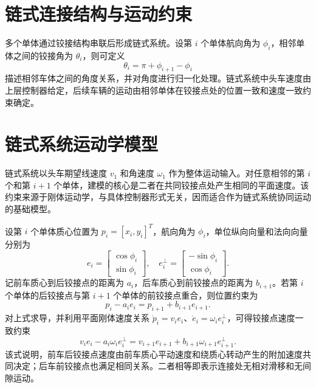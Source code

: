 \documentclass[type=bachelor]{bithesis}
\begin{document}
\section{链式连接结构与运动约束}
多个单体通过铰接结构串联后形成链式系统。设第 $i$ 个单体航向角为 $\phi_i$，相邻单体之间的铰接角为 $\theta_i$，则可定义
\begin{equation}
  \theta_i=\pi+\phi_{i+1}-\phi_i
\end{equation}
描述相邻车体之间的角度关系，并对角度进行归一化处理。链式系统中头车速度由上层控制器给定，后续车辆的运动由相邻单体在铰接点处的位置一致和速度一致约束确定。

\section{链式系统运动学模型}
链式系统以头车期望线速度 $v_1$ 和角速度 $\omega_1$ 作为整体运动输入。对任意相邻的第 $i$ 个和第 $i+1$ 个单体，建模的核心是二者在共同铰接点处产生相同的平面速度。该约束来源于刚体运动学，与具体控制器形式无关，因而适合作为链式系统协同运动的基础模型。

设第 $i$ 个单体质心位置为 $p_i=[x_i,y_i]^T$，航向角为 $\phi_i$，单位纵向向量和法向向量分别为
\begin{equation}
  e_i=
  \begin{bmatrix}
    \cos\phi_i\\
    \sin\phi_i
  \end{bmatrix},
  \quad
  e_i^\perp=
  \begin{bmatrix}
    -\sin\phi_i\\
    \cos\phi_i
  \end{bmatrix}.
\end{equation}
记前车质心到后铰接点的距离为 $a_i$，后车质心到前铰接点的距离为 $b_{i+1}$。若第 $i$ 个单体的后铰接点与第 $i+1$ 个单体的前铰接点重合，则位置约束为
\begin{equation}
  p_i-a_ie_i=p_{i+1}+b_{i+1}e_{i+1}.
\end{equation}
对上式求导，并利用平面刚体速度关系 $\dot{p}_i=v_ie_i$、$\dot{e}_i=\omega_ie_i^\perp$，可得铰接点速度一致约束
\begin{equation}
  v_ie_i-a_i\omega_ie_i^\perp
  =
  v_{i+1}e_{i+1}+b_{i+1}\omega_{i+1}e_{i+1}^\perp .
\end{equation}
该式说明，前车后铰接点速度由前车质心平动速度和绕质心转动产生的附加速度共同决定；后车前铰接点也满足相同关系。二者相等即表示连接处无相对滑移和无间隙运动。
\end{document}
